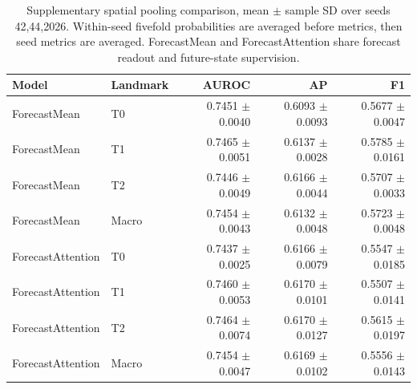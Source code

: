 \begin{table}[t]
\centering
\small
\caption{Supplementary spatial pooling comparison, mean $\pm$ sample SD over seeds 42,44,2026. Within-seed fivefold probabilities are averaged before metrics, then seed metrics are averaged. ForecastMean and ForecastAttention share forecast readout and future-state supervision.}
\label{tab:pooling}
\begin{tabular}{llrrr}
\toprule
Model & Landmark & AUROC & AP & F1 \\
\midrule
ForecastMean & T0 & 0.7451 $\pm$ 0.0040 & 0.6093 $\pm$ 0.0093 & 0.5677 $\pm$ 0.0047 \\
ForecastMean & T1 & 0.7465 $\pm$ 0.0051 & 0.6137 $\pm$ 0.0028 & 0.5785 $\pm$ 0.0161 \\
ForecastMean & T2 & 0.7446 $\pm$ 0.0049 & 0.6166 $\pm$ 0.0044 & 0.5707 $\pm$ 0.0033 \\
ForecastMean & Macro & 0.7454 $\pm$ 0.0043 & 0.6132 $\pm$ 0.0048 & 0.5723 $\pm$ 0.0048 \\
ForecastAttention & T0 & 0.7437 $\pm$ 0.0025 & 0.6166 $\pm$ 0.0079 & 0.5547 $\pm$ 0.0185 \\
ForecastAttention & T1 & 0.7460 $\pm$ 0.0053 & 0.6170 $\pm$ 0.0101 & 0.5507 $\pm$ 0.0141 \\
ForecastAttention & T2 & 0.7464 $\pm$ 0.0074 & 0.6170 $\pm$ 0.0127 & 0.5615 $\pm$ 0.0197 \\
ForecastAttention & Macro & 0.7454 $\pm$ 0.0047 & 0.6169 $\pm$ 0.0102 & 0.5556 $\pm$ 0.0143 \\
\bottomrule
\end{tabular}
\end{table}
